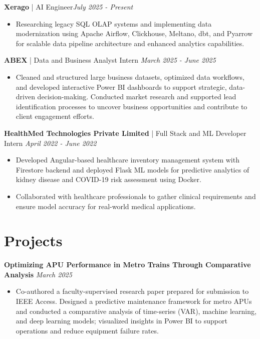 \documentclass[a4paper,10pt]{article}
\begin{document}
\noindent
\textbf{Xerago} | AI Engineer\hfill \textit{July 2025 - Present}
\begin{itemize}[leftmargin=*]
    \item Researching legacy SQL OLAP systems and implementing data modernization using Apache Airflow, Clickhouse, Meltano, dbt, and Pyarrow for scalable data pipeline architecture and enhanced analytics capabilities.
\end{itemize}

\noindent
\textbf{ABEX} | Data and Business Analyst Intern  \hfill \textit{March 2025 - June 2025}
\begin{itemize}[leftmargin=*]
    \item Cleaned and structured large business datasets, optimized data workflows, and developed interactive Power BI dashboards to support strategic, data-driven decision-making. Conducted market research and supported lead identification processes to uncover business opportunities and contribute to client engagement efforts.
\end{itemize}

\noindent
\textbf{HealthMed Technologies Private Limited} | Full Stack and ML Developer Intern \hfill \textit{April 2022 - June 2022}
\begin{itemize}[leftmargin=*]
    \item Developed Angular-based healthcare inventory management system with Firestore backend and deployed Flask ML models for predictive analytics of kidney disease and COVID-19 risk assessment using Docker.
    \item Collaborated with healthcare professionals to gather clinical requirements and ensure model accuracy for real-world medical applications.
\end{itemize}

\section{\textbf{Projects}}

\noindent
\textbf{Optimizing APU Performance in Metro Trains
Through Comparative Analysis}  \hfill \textit{March 2025}
\begin{itemize}[leftmargin=*]
    \item Co-authored a faculty-supervised research paper prepared for submission to IEEE Access. Designed a predictive maintenance framework for metro APUs and conducted a comparative analysis of time-series (VAR), machine learning, and deep learning models; visualized insights in Power BI to support operations and reduce equipment failure rates.
\end{itemize}
\end{document}
